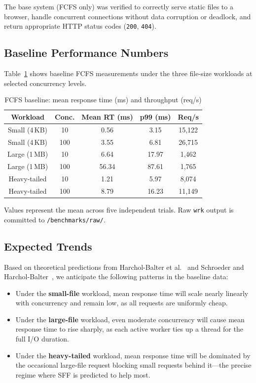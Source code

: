 \documentclass[conference]{IEEEtran}
\begin{document}
The base system (FCFS only) was verified to correctly serve static files to a
browser, handle concurrent connections without data corruption or deadlock,
and return appropriate HTTP status codes (\texttt{200}, \texttt{404}).

\subsection{Baseline Performance Numbers}

Table~\ref{tab:baseline} shows baseline FCFS measurements under the three
file-size workloads at selected concurrency levels. 

\begin{table}[h]
\centering
\caption{FCFS baseline: mean response time (ms) and throughput (req/s)}
\label{tab:baseline}
\begin{tabular}{@{}ccccc@{}}
\toprule
\textbf{Workload} & \textbf{Conc.} & \textbf{Mean RT (ms)} & \textbf{p99 (ms)} & \textbf{Req/s} \\
\midrule
Small (4\,KB)  &  10 & 0.56  & 3.15  & 15{,}122 \\
Small (4\,KB)  & 100 & 3.55  & 6.81  & 26{,}715 \\
Large (1\,MB)  &  10 & 6.64  & 17.97 & 1{,}462  \\
Large (1\,MB)  & 100 & 56.34 & 87.61 & 1{,}765  \\
Heavy-tailed   &  10 & 1.21  & 5.97  & 8{,}074  \\
Heavy-tailed   & 100 & 8.79  & 16.23 & 11{,}149 \\
\bottomrule
\end{tabular}
\end{table}

Values represent the mean across five independent trials. Raw
\texttt{wrk} output is committed to \texttt{/benchmarks/raw/}.

\subsection{Expected Trends}

Based on theoretical predictions from Harchol-Balter et al.~\cite{harchol2003}
and Schroeder and Harchol-Balter~\cite{schroeder2006}, we anticipate the
following patterns in the baseline data:

\begin{itemize}
  \item Under the \textbf{small-file} workload, mean response time will scale
    nearly linearly with concurrency and remain low, as all requests are
    uniformly cheap.
  \item Under the \textbf{large-file} workload, even moderate concurrency will
    cause mean response time to rise sharply, as each active worker ties up a
    thread for the full I/O duration.
  \item Under the \textbf{heavy-tailed} workload, mean response time will be
    dominated by the occasional large-file request blocking small requests
    behind it---the precise regime where SFF is predicted to help most.
\end{itemize}
\end{document}
